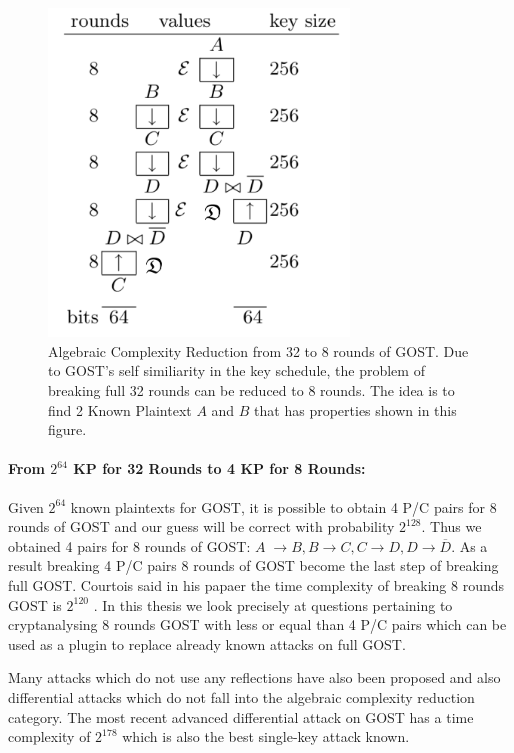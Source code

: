 \begin{figure}[h!] 
	\centering
	\includegraphics[width=80mm]{./pics/GOSTRef.png}
	
	\caption[Algebraic Complexity Reduction from 32 to 8 rounds of GOST] {Algebraic Complexity Reduction from 32 to 8 rounds of GOST. Due to GOST's self similiarity in the key schedule, the problem of breaking full 32 rounds can be reduced to 8 rounds. The idea is to find 2 Known Plaintext $A$ and $B$ that has properties shown in this figure. }
	\label{GOSTRef}
\end{figure}

\paragraph{From $2^{64}$ KP for 32 Rounds to 4 KP for 8 Rounds:}
Given $2^{64}$ known plaintexts for GOST, it is possible to obtain 4 P/C pairs for 8 rounds of GOST and our guess will be correct with probability $2^{128}$. Thus we obtained 4 pairs for 8 rounds of GOST: $A 􏰀\rightarrow B, B \rightarrow C, C \rightarrow D, D \rightarrow \overline{D}$. As a result breaking 4 P/C pairs 8 rounds of GOST become the last step of breaking full GOST. Courtois said in his papaer the time complexity of breaking 8 rounds GOST is $2^{120}$ \cite{gostreport}. In this thesis we look precisely at questions pertaining to cryptanalysing 8 rounds GOST with less or equal than 4 P/C pairs which can be used as a plugin to replace already known attacks on full GOST.

Many attacks which do not use any reflections
have also been proposed \cite{gostac,gostreport,DunkelmanImprovedGOST8R}
and also differential attacks which do not
fall into the algebraic complexity reduction category.
The most recent advanced differential attack on GOST
has a time complexity of $2^{178}$ \cite{gostdc0,gostdc2}
which is also the best single-key attack known.

